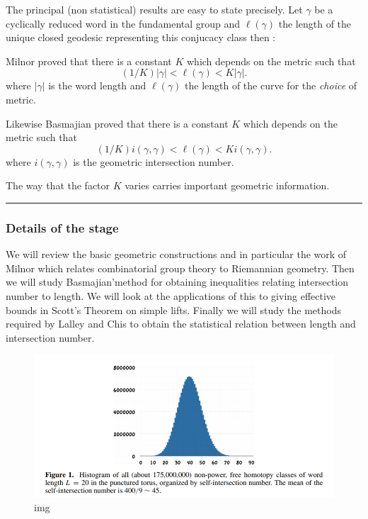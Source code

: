 \documentclass[
]{article}
\begin{document}
The principal (non statistical) results are easy to state precisely. Let
\(\gamma\) be a cyclically reduced word in the fundamental group and
\(\ell(\gamma)\) the length of the unique closed geodesic representing
this conjucacy class then :

Milnor proved that there is a constant \(K\) which depends on the metric
such that \[(1/K) |\gamma| < \ell(\gamma) < K|\gamma|. \] where
\(|\gamma|\) is the word length and \(\ell(\gamma)\) the length of the
curve for the \emph{choice} of metric.

Likewise Basmajian proved that there is a constant \(K\) which depends
on the metric such that
\[(1/K) i(\gamma,\gamma) < \ell(\gamma) < K i(\gamma,\gamma). \] where
\(i(\gamma,\gamma)\) is the geometric intersection number.

The way that the factor \(K\) varies carries important geometric
information.

\begin{center}\rule{0.5\linewidth}{0.5pt}\end{center}

\hypertarget{details-of-the-stage}{%
\subsubsection{Details of the stage}\label{details-of-the-stage}}

We will review the basic geometric constructions and in particular the
work of Milnor which relates combinatorial group theory to Riemannian
geometry. Then we will study Basmajian'method for obtaining inequalities
relating intersection number to length. We will look at the applications
of this to giving effective bounds in Scott's Theorem on simple lifts.
Finally we will study the methods required by Lalley and Chis to obtain
the statistical relation between length and intersection number.

\begin{figure}
\centering
\includegraphics{./chas.png}
\caption{img}
\end{figure}
\end{document}
